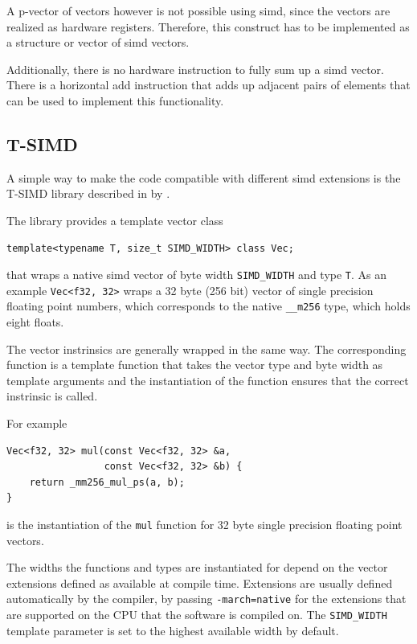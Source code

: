\documentclass[a4paper, 11pt]{memoir}
\begin{document}
    A p-vector of vectors however is not possible using \gls{simd}, since the vectors are realized as hardware registers.
    Therefore, this construct has to be implemented as a structure or vector of \gls{simd} vectors.
    
    Additionally, there is no hardware instruction to fully sum up a \gls{simd} vector. There is a horizontal add instruction
    that adds up adjacent pairs of elements that can be used to implement this functionality.

    \subsection{T-SIMD}
    \label{sec:tsimd}
    A simple way to make the code compatible with different \gls{simd} extensions is the T-SIMD library described in
    \cite{own_moeller_16_2} by \citeauthor{own_moeller_16_2}.

    The library provides a template vector class
    \begin{verbatim}
template<typename T, size_t SIMD_WIDTH> class Vec;
    \end{verbatim}
    that wraps a native \gls{simd} vector of byte width \texttt{SIMD_WIDTH} and type \texttt{T}. As an
    example \texttt{Vec<f32, 32>} wraps a 32 byte (256 bit) vector of single precision floating point numbers,
    which corresponds to the native \texttt{__m256} type, which holds eight floats.

    The vector instrinsics are generally wrapped in the same way. The corresponding function is a template function that
    takes the vector type and byte width as template arguments and the instantiation of the function ensures that the
    correct instrinsic is called.

    For example
    \begin{verbatim}
Vec<f32, 32> mul(const Vec<f32, 32> &a,
                 const Vec<f32, 32> &b) {
    return _mm256_mul_ps(a, b);
}
    \end{verbatim}
    is the instantiation of the \texttt{mul} function for 32 byte single precision floating point vectors.

    The widths the functions and types are instantiated for depend on the vector extensions defined as available at compile
    time. Extensions are usually defined automatically by the compiler, \eg by passing \texttt{-march=native} for
    the extensions that are supported on the CPU that the software is compiled on. The \texttt{SIMD_WIDTH}
    template parameter is set to the highest available width by default.
\end{document}
